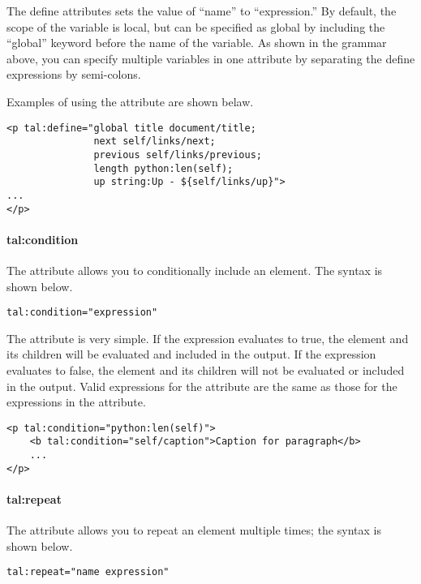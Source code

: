 The define attributes sets the value of ``name'' to ``expression.''  
By default, the scope of the variable is local, but can be specified
as global by including the ``global'' keyword before the name of the 
variable.  As shown in the grammar above, you can specify multiple 
variables in one  attribute by separating the define
expressions by semi-colons.

Examples of using the  attribute are shown belaw.
\begin{verbatim}
<p tal:define="global title document/title; 
               next self/links/next;
               previous self/links/previous;
               length python:len(self);
               up string:Up - ${self/links/up}">
...
</p>
\end{verbatim}


\paragraph{tal:condition}

The  attribute allows you to conditionally include
an element.  The syntax is shown below.
\begin{verbatim}
tal:condition="expression"
\end{verbatim}

The  attribute is very simple.  If the expression
evaluates to true, the element and its children will be evaluated and 
included in the output.  If the expression evaluates to false, the element 
and its children will not be evaluated or included in the output.
Valid expressions for the  attribute are the same 
as those for the expressions in the  attribute.
\begin{verbatim}
<p tal:condition="python:len(self)">
    <b tal:condition="self/caption">Caption for paragraph</b>
    ...
</p>
\end{verbatim}


\paragraph{tal:repeat\label{sec:talrepeat}}

The  attribute allows you to repeat an element multiple 
times; the syntax is shown below.
\begin{verbatim}
tal:repeat="name expression"
\end{verbatim}

